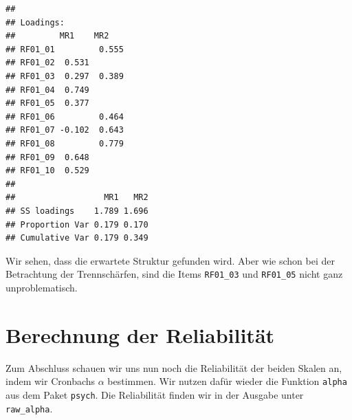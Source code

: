\documentclass[
  ngerman,
]{book}
\begin{document}
\begin{verbatim}
## 
## Loadings:
##         MR1    MR2   
## RF01_01         0.555
## RF01_02  0.531       
## RF01_03  0.297  0.389
## RF01_04  0.749       
## RF01_05  0.377       
## RF01_06         0.464
## RF01_07 -0.102  0.643
## RF01_08         0.779
## RF01_09  0.648       
## RF01_10  0.529       
## 
##                  MR1   MR2
## SS loadings    1.789 1.696
## Proportion Var 0.179 0.170
## Cumulative Var 0.179 0.349
\end{verbatim}

Wir sehen, dass die erwartete Struktur gefunden wird. Aber wie schon bei der Betrachtung der Trennschärfen, sind die Items \texttt{RF01\_03} und \texttt{RF01\_05} nicht ganz unproblematisch.

\chapter{Berechnung der Reliabilität}\label{berechnung-der-reliabilituxe4t}

Zum Abschluss schauen wir uns nun noch die Reliabilität der beiden Skalen an, indem wir Cronbachs \(\alpha\) bestimmen. Wir nutzen dafür wieder die Funktion \texttt{alpha} aus dem Paket \texttt{psych}. Die Reliabilität finden wir in der Ausgabe unter \texttt{raw\_alpha}.
\end{document}

